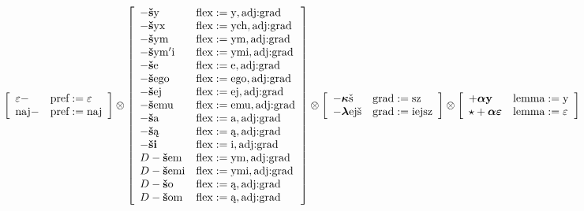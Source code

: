 \documentclass{article}
\begin{document}
\begin{scriptsize}\[
\left[\begin{array}{ll}
\varepsilon- & \text{pref}:=\text{$\varepsilon$}\\
\text{naj}- & \text{pref}:=\text{naj}
\end{array}\right] \otimes \left[\begin{array}{ll}
-\text{{\bf š}y} & \text{flex}:=\text{y}, \text{adj:grad}\\
-\text{{\bf š}yx} & \text{flex}:=\text{ych}, \text{adj:grad}\\
-\text{{\bf š}ym} & \text{flex}:=\text{ym}, \text{adj:grad}\\
-\text{{\bf š}ym$'$i} & \text{flex}:=\text{ymi}, \text{adj:grad}\\
-\text{{\bf š}e} & \text{flex}:=\text{e}, \text{adj:grad}\\
-\text{{\bf š}ego} & \text{flex}:=\text{ego}, \text{adj:grad}\\
-\text{{\bf š}ej} & \text{flex}:=\text{ej}, \text{adj:grad}\\
-\text{{\bf š}emu} & \text{flex}:=\text{emu}, \text{adj:grad}\\
-\text{{\bf š}a} & \text{flex}:=\text{a}, \text{adj:grad}\\
-\text{{\bf š}ą} & \text{flex}:=\text{ą}, \text{adj:grad}\\
-\text{{\bf ši}} & \text{flex}:=\text{i}, \text{adj:grad}\\
D-\text{{\bf š}em} & \text{flex}:=\text{ym}, \text{adj:grad}\\
D-\text{{\bf š}emi} & \text{flex}:=\text{ymi}, \text{adj:grad}\\
D-\text{{\bf š}o} & \text{flex}:=\text{ą}, \text{adj:grad}\\
D-\text{{\bf š}om} & \text{flex}:=\text{ą}, \text{adj:grad}
\end{array}\right] \otimes \left[\begin{array}{ll}
-\text{\boldmath$\kappa$š} & \text{grad}:=\text{sz}\\
-\text{\boldmath$\lambda$ejš} & \text{grad}:=\text{iejsz}
\end{array}\right] \otimes \left[\begin{array}{ll}
+\text{\boldmath$\alpha${\bf y}} & \text{lemma}:=\text{y}\\
\star+\text{\boldmath$\alpha\varepsilon$} & \text{lemma}:=\text{$\varepsilon$}
\end{array}\right]
\]\end{scriptsize}
\end{document}
